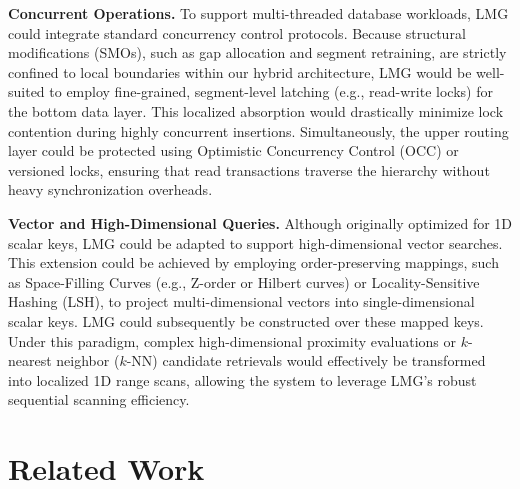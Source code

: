 \textbf{Concurrent Operations.} To support multi-threaded database workloads, LMG could integrate standard concurrency control protocols. Because structural modifications (SMOs), such as gap allocation and segment retraining, are strictly confined to local boundaries within our hybrid architecture, LMG would be well-suited to employ fine-grained, segment-level latching (e.g., read-write locks) for the bottom data layer. This localized absorption would drastically minimize lock contention during highly concurrent insertions. Simultaneously, the upper routing layer could be protected using Optimistic Concurrency Control (OCC) or versioned locks, ensuring that read transactions traverse the hierarchy without heavy synchronization overheads.

\textbf{Vector and High-Dimensional Queries.} Although originally optimized for 1D scalar keys, LMG could be adapted to support high-dimensional vector searches. This extension could be achieved by employing order-preserving mappings, such as Space-Filling Curves (e.g., Z-order or Hilbert curves) or Locality-Sensitive Hashing (LSH), to project multi-dimensional vectors into single-dimensional scalar keys. LMG could subsequently be constructed over these mapped keys. Under this paradigm, complex high-dimensional proximity evaluations or $k$-nearest neighbor ($k$-NN) candidate retrievals would effectively be transformed into localized 1D range scans, allowing the system to leverage LMG's robust sequential scanning efficiency.



\section{Related Work}
\label{sec:rel-work}

